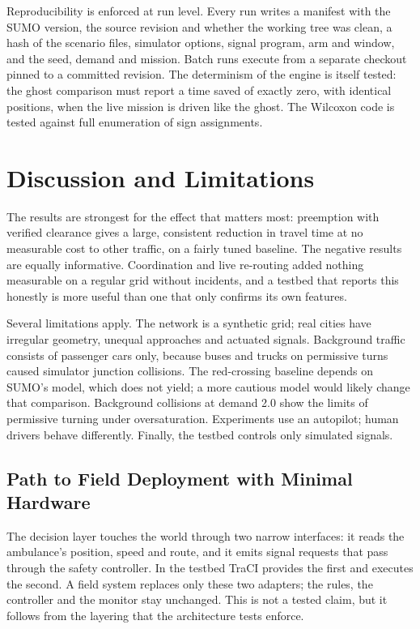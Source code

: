 \documentclass[conference]{IEEEtran}
\begin{document}
Reproducibility is enforced at run level. Every run writes a manifest with the SUMO version, the source revision and whether the working tree was clean, a hash of the scenario files, simulator options, signal program, arm and window, and the seed, demand and mission. Batch runs execute from a separate checkout pinned to a committed revision. The determinism of the engine is itself tested: the ghost comparison must report a time saved of exactly zero, with identical positions, when the live mission is driven like the ghost. The Wilcoxon code is tested against full enumeration of sign assignments.

\section{Discussion and Limitations}

The results are strongest for the effect that matters most: preemption with verified clearance gives a large, consistent reduction in travel time at no measurable cost to other traffic, on a fairly tuned baseline. The negative results are equally informative. Coordination and live re-routing added nothing measurable on a regular grid without incidents, and a testbed that reports this honestly is more useful than one that only confirms its own features.

Several limitations apply. The network is a synthetic grid; real cities have irregular geometry, unequal approaches and actuated signals. Background traffic consists of passenger cars only, because buses and trucks on permissive turns caused simulator junction collisions. The red-crossing baseline depends on SUMO's model, which does not yield; a more cautious model would likely change that comparison. Background collisions at demand 2.0 show the limits of permissive turning under oversaturation. Experiments use an autopilot; human drivers behave differently. Finally, the testbed controls only simulated signals.

\subsection{Path to Field Deployment with Minimal Hardware}

The decision layer touches the world through two narrow interfaces: it reads the ambulance's position, speed and route, and it emits signal requests that pass through the safety controller. In the testbed TraCI provides the first and executes the second. A field system replaces only these two adapters; the rules, the controller and the monitor stay unchanged. This is not a tested claim, but it follows from the layering that the architecture tests enforce.
\end{document}

